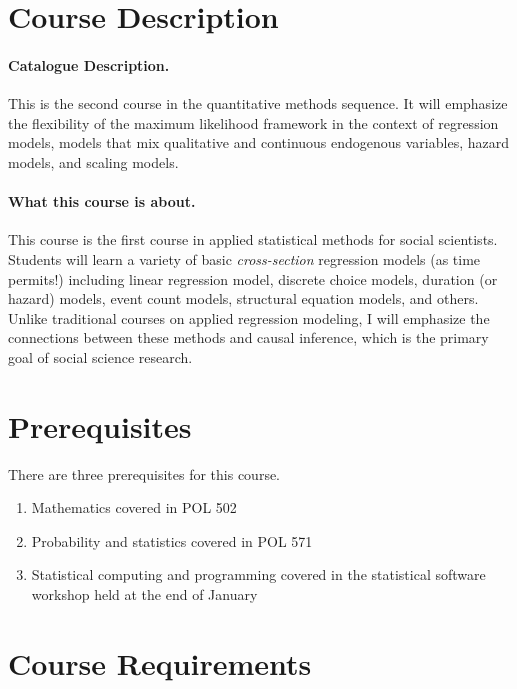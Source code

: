 \documentclass[11pt]{article}
\begin{document}
\section{Course Description}

\paragraph{Catalogue Description.} This is the second course in the
quantitative methods sequence. It will emphasize the flexibility of
the maximum likelihood framework in the context of regression models,
models that mix qualitative and continuous endogenous variables,
hazard models, and scaling models.

\paragraph{What this course is about.} This course is the first course
in applied statistical methods for social scientists. Students will
learn a variety of basic {\it cross-section} regression models (as
time permits!) including linear regression model, discrete choice
models, duration (or hazard) models, event count models, structural
equation models, and others.  Unlike traditional courses on applied
regression modeling, I will emphasize the connections between these
methods and causal inference, which is the primary goal of social
science research.


\section{Prerequisites}

There are three prerequisites for this course.
\begin{enumerate}
\item Mathematics covered in POL 502
\item Probability and statistics covered in POL 571
\item Statistical computing and programming covered in the statistical
  software workshop held at the end of January
\end{enumerate}

\section{Course Requirements}
\end{document}
